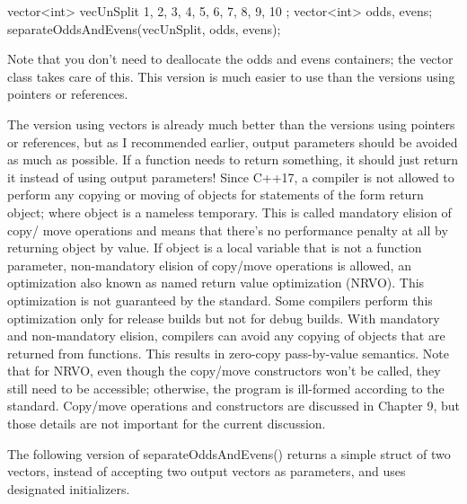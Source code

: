 \begin{cpp}
vector<int> vecUnSplit { 1, 2, 3, 4, 5, 6, 7, 8, 9, 10 };
vector<int> odds, evens;
separateOddsAndEvens(vecUnSplit, odds, evens);
\end{cpp}

Note that you don’t need to deallocate the odds and evens containers; the vector class takes care of this. This version is much easier to use than the versions using pointers or references.

The version using vectors is already much better than the versions using pointers or references, but as I recommended earlier, output parameters should be avoided as much as possible. If a function needs to return something, it should just return it instead of using output parameters! Since C++17, a compiler is not allowed to perform any copying or moving of objects for statements of the form return object; where object is a nameless temporary. This is called mandatory elision of copy/ move operations and means that there’s no performance penalty at all by returning object by value. If object is a local variable that is not a function parameter, non-mandatory elision of copy/move operations is allowed, an optimization also known as named return value optimization (NRVO). This optimization is not guaranteed by the standard. Some compilers perform this optimization only for release builds but not for debug builds. With mandatory and non-mandatory elision, compilers can avoid any copying of objects that are returned from functions. This results in zero-copy pass-by-value semantics. Note that for NRVO, even though the copy/move constructors won’t be called, they still need to be accessible; otherwise, the program is ill-formed according to the standard. Copy/move operations and constructors are discussed in Chapter 9, but those details are not important for the current discussion.

The following version of separateOddsAndEvens() returns a simple struct of two vectors, instead of accepting two output vectors as parameters, and uses designated initializers.


